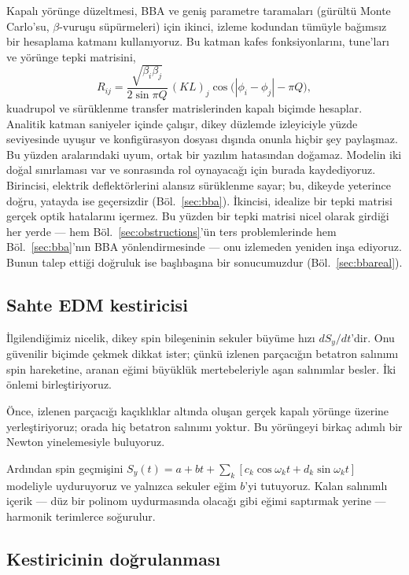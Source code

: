 \documentclass[aps,prab,reprint,superscriptaddress,nofootinbib]{revtex4-2}
\begin{document}
Kapalı yörünge düzeltmesi, BBA ve geniş parametre taramaları (gürültü Monte Carlo'su,
$\beta$-vuruşu süpürmeleri) için ikinci, izleme kodundan tümüyle bağımsız bir
hesaplama katmanı kullanıyoruz. Bu katman kafes fonksiyonlarını, tune'ları ve yörünge
tepki matrisini,
\begin{equation}
  R_{ij} = \frac{\sqrt{\beta_i\beta_j}}{2\sin\pi Q}\,(KL)_j
  \cos\!\big(|\phi_i-\phi_j| - \pi Q\big),
  \label{eq:R}
\end{equation}
kuadrupol ve sürüklenme transfer matrislerinden kapalı biçimde hesaplar. Analitik
katman saniyeler içinde çalışır, dikey düzlemde izleyiciyle yüzde seviyesinde uyuşur
ve konfigürasyon dosyası dışında onunla hiçbir şey paylaşmaz. Bu yüzden aralarındaki
uyum, ortak bir yazılım hatasından doğamaz. Modelin iki doğal sınırlaması var ve
sonrasında rol oynayacağı için burada kaydediyoruz. Birincisi, elektrik deflektörlerini
alansız sürüklenme sayar; bu, dikeyde yeterince doğru, yatayda ise geçersizdir
(Böl.~\ref{sec:bba}). İkincisi, idealize bir tepki matrisi gerçek optik hatalarını
içermez. Bu yüzden bir tepki matrisi nicel olarak girdiği her yerde --- hem
Böl.~\ref{sec:obstructions}'ün ters problemlerinde hem Böl.~\ref{sec:bba}'nın BBA
yönlendirmesinde --- onu izlemeden yeniden inşa ediyoruz. Bunun talep ettiği doğruluk
ise başlıbaşına bir sonucumuzdur (Böl.~\ref{sec:bbareal}).

\subsection{Sahte EDM kestiricisi}
\label{sec:estimator}

İlgilendiğimiz nicelik, dikey spin bileşeninin sekuler büyüme hızı $dS_y/dt$'dir.
Onu güvenilir biçimde çekmek dikkat ister; çünkü izlenen parçacığın betatron salınımı
spin hareketine, aranan eğimi büyüklük mertebeleriyle aşan salınımlar besler. İki
önlemi birleştiriyoruz.

Önce, izlenen parçacığı kaçıklıklar altında oluşan gerçek kapalı yörünge üzerine
yerleştiriyoruz; orada hiç betatron salınımı yoktur. Bu yörüngeyi birkaç adımlı bir
Newton yinelemesiyle buluyoruz.

Ardından spin geçmişini
$S_y(t) = a + bt + \sum_k \left[c_k\cos\omega_k t + d_k\sin\omega_k t\right]$
modeliyle uyduruyoruz ve yalnızca sekuler eğim $b$'yi tutuyoruz. Kalan salınımlı
içerik --- düz bir polinom uydurmasında olacağı gibi eğimi saptırmak yerine ---
harmonik terimlerce soğurulur.

\subsection{Kestiricinin doğrulanması}
\label{sec:validation}
\end{document}
